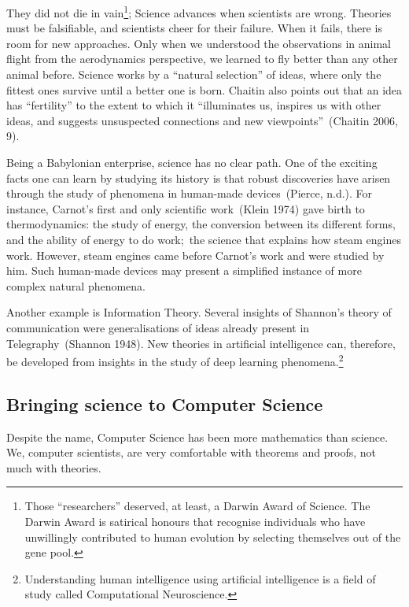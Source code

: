 \documentclass[
  letterpaper,
]{tufte-book}
\begin{document}
They did not die in vain\footnote{Those ``researchers'' deserved, at
  least, a Darwin Award of Science. The Darwin Award is satirical
  honours that recognise individuals who have unwillingly contributed to
  human evolution by selecting themselves out of the gene pool.};
Science advances when scientists are wrong. Theories must be
falsifiable, and scientists cheer for their failure. When it fails,
there is room for new approaches. Only when we understood the
observations in animal flight from the aerodynamics perspective, we
learned to fly better than any other animal before. Science works by a
``natural selection'' of ideas, where only the fittest ones survive
until a better one is born. Chaitin also points out that an idea has
``fertility'' to the extent to which it ``illuminates us, inspires us
with other ideas, and suggests unsuspected connections and new
viewpoints''~(Chaitin 2006, 9).

Being a Babylonian enterprise, science has no clear path. One of the
exciting facts one can learn by studying its history is that robust
discoveries have arisen through the study of phenomena in human-made
devices~(Pierce, n.d.). For instance, Carnot's first and only scientific
work~(Klein 1974) gave birth to thermodynamics: the study of energy, the
conversion between its different forms, and the ability of energy to do
work;~the science that explains how steam engines work. However, steam
engines came before Carnot's work and were studied by him. Such
human-made devices may present a simplified instance of more complex
natural phenomena.

Another example is Information Theory. Several insights of Shannon's
theory of communication were generalisations of ideas already present in
Telegraphy~(Shannon 1948). New theories in artificial intelligence can,
therefore, be developed from insights in the study of deep learning
phenomena.\footnote{Understanding human intelligence using artificial
  intelligence is a field of study called Computational Neuroscience.}

\hypertarget{sec:bringing_science}{%
\subsection{Bringing science to Computer
Science}\label{sec:bringing_science}}

Despite the name, Computer Science has been more mathematics than
science. We, computer scientists, are very comfortable with theorems and
proofs, not much with theories.
\end{document}
